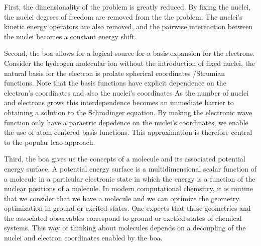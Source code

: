 First, the dimensionality of the problem is greatly reduced.
By fixing the nuclei, the nuclei degrees of freedom are removed from the the problem.
The nuclei's kinetic energy operators are also removed, and the pairwise intereaction between the nuclei becomes a constant energy shift.

Second, the \gls{boa} allows for a logical source for a basis expansion for the electrons.
Consider the hydrogen molecular ion without the introduction of fixed nuclei, the natural basis for the electron is prolate spherical coordinates /Strumian functions.
Note that the basis functions have explicit dependence on the electron's coordinates and also the nuclei's coordinates
As the number of nuclei and electrons grows this interdependence becomes an immediate barrier to obtaining a solution to the Schrodinger equation.
By making the electronic wave function only have a paraetric depedence on the nuclei's coordinates, we enable the use of atom centered basis functions.
This approximation is therefore central to the popular \gls{lcao} approach.

Third, the \gls{boa} gives us the concepts of a molecule and its associated potential energy surface.
A potential energy surface is a multidimensional scalar function of a molecule in a particular electronic state in which the energy is a function of the nuclear positions of a molecule.
In modern computational chemsitry, it is routine that we consider that we have a molecule and we can optimize the geometry optimization in ground or excited states.
One expects that these geometries and the associated observables correspond to ground or exctied states of chemical systems.
This way of thinking about molecules depends on a decoupling of the nuclei and electron coordinates enabled by the \gls{boa}.
